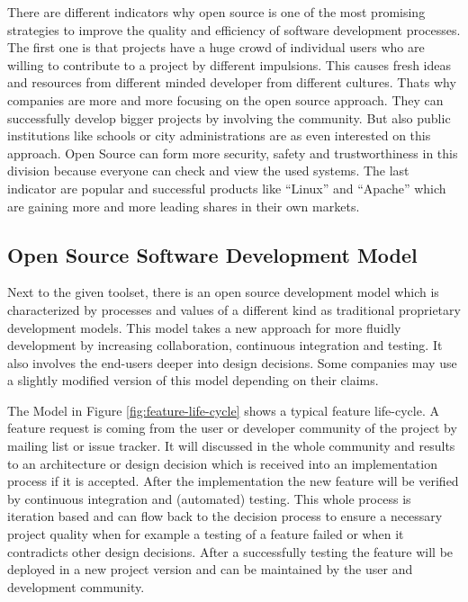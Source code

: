 \documentclass[DIV=calc,paper=a4,fontsize=9pt,twocolumn]{scrartcl}
\begin{document}
There are different indicators why open source is one of the most promising strategies to improve the quality and efficiency of software development processes. The first one is that projects have a huge crowd of individual users who are willing to contribute to a project by different impulsions. This causes fresh ideas and resources from different minded developer from different cultures. Thats why companies are more and more focusing on the open source approach. They can successfully develop bigger projects by involving the community. But also public institutions like schools or city administrations are as even interested on this approach. Open Source can form more security, safety and trustworthiness in this division because everyone can check and view the used systems. The last indicator are popular and successful products like \enquote{Linux} and \enquote{Apache} which are gaining more and more leading shares in their own markets. \citep{fuggetta2003open}

\subsection{Open Source Software Development Model}

Next to the given toolset, there is an open source development model which is characterized by processes and values of a different kind as traditional proprietary development models. This model takes a new approach for more fluidly development by increasing collaboration, continuous integration and testing. It also involves the end-users deeper into design decisions. Some companies may use a slightly modified version of this model depending on their claims. \citep{Haddad11}

The Model in Figure \ref{fig:feature-life-cycle} shows a typical feature life-cycle. A feature request is coming from the user or developer community of the project by mailing list or issue tracker. It will discussed in the whole community and results to an architecture or design decision which is received into an implementation process if it is accepted. After the implementation the new feature will be verified by continuous integration and (automated) testing. This whole process is iteration based and can flow back to the decision process to ensure a necessary project quality when for example a testing of a feature failed or when it contradicts other design decisions. After a successfully testing the feature will be deployed in a new project version and can be maintained by the user and development community. \citep{Haddad11}
\end{document}
